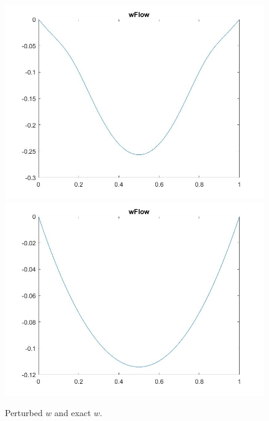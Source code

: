 \documentclass[11pt, a4paper]{article}
\theoremstyle{definition}
\begin{document}
\begin{figure}[h]
	\includegraphics[scale=0.3]{wFlint3.jpg}
	\includegraphics[scale=0.3]{wFlint4.jpg}
	\caption{Perturbed $w$ and exact $w$.}
	\label{Figlint1}
\end{figure}
\end{document}

